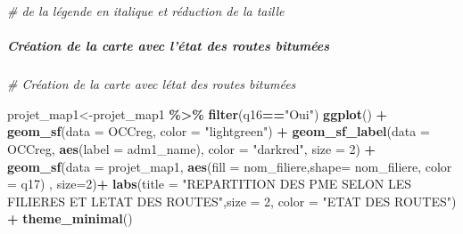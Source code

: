 \documentclass[
]{article}
\newenvironment{Shaded}{\begin{snugshade}}{\end{snugshade}}
\newcommand{\AttributeTok}[1]{\textcolor[rgb]{0.13,0.29,0.53}{#1}}
\newcommand{\CommentTok}[1]{\textcolor[rgb]{0.56,0.35,0.01}{\textit{#1}}}
\newcommand{\DecValTok}[1]{\textcolor[rgb]{0.00,0.00,0.81}{#1}}
\newcommand{\FunctionTok}[1]{\textcolor[rgb]{0.13,0.29,0.53}{\textbf{#1}}}
\newcommand{\NormalTok}[1]{#1}
\newcommand{\OtherTok}[1]{\textcolor[rgb]{0.56,0.35,0.01}{#1}}
\newcommand{\SpecialCharTok}[1]{\textcolor[rgb]{0.81,0.36,0.00}{\textbf{#1}}}
\newcommand{\StringTok}[1]{\textcolor[rgb]{0.31,0.60,0.02}{#1}}
\begin{document}
\begin{Shaded}
\begin{Highlighting}[]
                       \CommentTok{\# de la légende en italique et réduction de la taille}
\end{Highlighting}
\end{Shaded}

\hfill\break

\hypertarget{cruxe9ation-de-la-carte-avec-luxe9tat-des-routes-bitumuxe9es}{%
\subparagraph{Création de la carte avec l'état des routes
bitumées}\label{cruxe9ation-de-la-carte-avec-luxe9tat-des-routes-bitumuxe9es}}

\hfill\break

\begin{Shaded}
\begin{Highlighting}[]
\CommentTok{\# Création de la carte avec l\textquotesingle{}état des routes bitumées}

\NormalTok{projet\_map1}\OtherTok{\textless{}{-}}\NormalTok{projet\_map1 }\SpecialCharTok{\%\textgreater{}\%} \FunctionTok{filter}\NormalTok{(q16}\SpecialCharTok{==}\StringTok{"Oui"}\NormalTok{)}
\FunctionTok{ggplot}\NormalTok{() }\SpecialCharTok{+}
  \FunctionTok{geom\_sf}\NormalTok{(}\AttributeTok{data =}\NormalTok{ OCCreg, }\AttributeTok{color =} \StringTok{"lightgreen"}\NormalTok{) }\SpecialCharTok{+}
  \FunctionTok{geom\_sf\_label}\NormalTok{(}\AttributeTok{data =}\NormalTok{ OCCreg, }\FunctionTok{aes}\NormalTok{(}\AttributeTok{label =}\NormalTok{ adm1\_name), }\AttributeTok{color =} \StringTok{"darkred"}\NormalTok{, }\AttributeTok{size =} \DecValTok{2}\NormalTok{) }\SpecialCharTok{+}
  \FunctionTok{geom\_sf}\NormalTok{(}\AttributeTok{data =}\NormalTok{ projet\_map1, }\FunctionTok{aes}\NormalTok{(}\AttributeTok{fill =}\NormalTok{ nom\_filiere,}\AttributeTok{shape=}\NormalTok{ nom\_filiere, }\AttributeTok{color =}\NormalTok{ q17) , }\AttributeTok{size=}\DecValTok{2}\NormalTok{)}\SpecialCharTok{+}
  \FunctionTok{labs}\NormalTok{(}\AttributeTok{title =} \StringTok{"REPARTITION DES PME SELON LES FILIERES ET L\textquotesingle{}ETAT DES ROUTES"}\NormalTok{,}\AttributeTok{size =} \DecValTok{2}\NormalTok{,}
       \AttributeTok{color =} \StringTok{"ETAT DES ROUTES"}\NormalTok{) }\SpecialCharTok{+}
  \FunctionTok{theme\_minimal}\NormalTok{() }
\end{Highlighting}
\end{Shaded}
\end{document}
